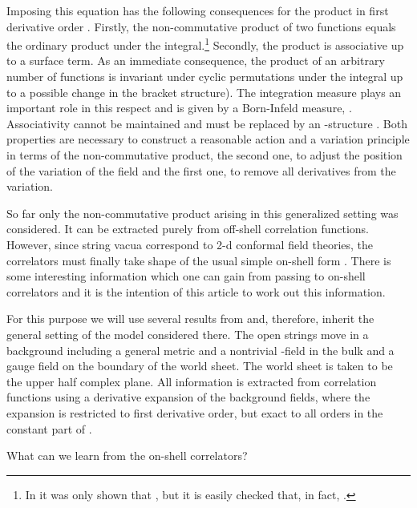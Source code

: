 \documentclass[a4paper,11pt]{article}               \def\new#1\endnew{{\bf #1}}
\providecommand {\cF} {{\cal F}}
\begin{document}
Imposing this equation has the
following consequences for the product in first derivative order 
\cite{Herbst:2001ai}.
Firstly, the non-commutative product of two functions equals the
ordinary product under the integral.\footnote{
In \cite{Herbst:2001ai} it was only shown that 
\coordHE{}, 
but it is easily checked that, in fact, \coordHE{}.
}
Secondly, the product is associative up to a surface term.
As an immediate consequence, the product of 
an arbitrary number of functions is invariant under cyclic
permutations under the integral up to a possible change in the
bracket structure). The integration measure plays an important role 
in this respect and is given by a Born-Infeld measure, 
\myHighlight{$\sqrt{\det(g-\cF)}$}\coordHE{}. Associativity cannot be maintained and must be 
replaced by an \coordHE{}-structure \cite{Cornalba:2002sm,stasheff}. 
Both properties are necessary to construct a reasonable action and a 
variation principle in terms of the non-commutative
product, the second one, to adjust the position of the variation of
the field and the first one, to remove all derivatives from the variation.

So far only the non-commutative product arising in this generalized setting
was considered. It can be
extracted purely from off-shell correlation functions. However, since 
string vacua correspond to 2-d 
conformal field theories, the correlators must finally take 
shape of the usual simple on-shell form \cite{Polchinski:1998rq}. 
There is some interesting information which one can gain from passing 
to on-shell correlators and it is the intention of this 
article to work out this information. 

For this purpose we will use several results from \cite{Herbst:2001ai}
and, therefore, inherit the
general setting of the model considered there. The open strings move
in a background including a general metric \coordHE{} and a nontrivial \coordHE{}-field 
in the bulk and a gauge field \coordHE{} on the boundary of the world sheet.
The world sheet is taken to be the upper half complex plane. All 
information is extracted from correlation functions using a derivative 
expansion of the background fields, where the expansion is restricted to 
first derivative order, but exact to all orders in the constant part of 
\myHighlight{$\cF$}\coordHE{}.

\newpage
\noindent
What can we learn from the on-shell correlators? 
\end{document}
